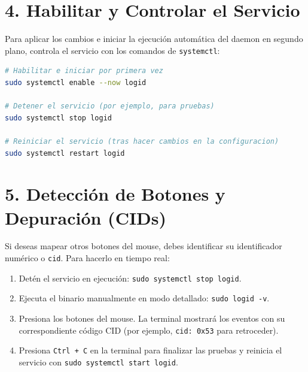 \documentclass[11pt,a4paper]{article}
\begin{document}
\section{4. Habilitar y Controlar el Servicio}
Para aplicar los cambios e iniciar la ejecución automática del daemon en segundo plano, controla el servicio con los comandos de \texttt{systemctl}:

\begin{lstlisting}[language=bash]
# Habilitar e iniciar por primera vez
sudo systemctl enable --now logid

# Detener el servicio (por ejemplo, para pruebas)
sudo systemctl stop logid

# Reiniciar el servicio (tras hacer cambios en la configuracion)
sudo systemctl restart logid
\end{lstlisting}

\section{5. Detección de Botones y Depuración (CIDs)}
Si deseas mapear otros botones del mouse, debes identificar su identificador numérico o \texttt{cid}. Para hacerlo en tiempo real:

\begin{enumerate}
    \item Detén el servicio en ejecución: \texttt{sudo systemctl stop logid}.
    \item Ejecuta el binario manualmente en modo detallado: \texttt{sudo logid -v}.
    \item Presiona los botones del mouse. La terminal mostrará los eventos con su correspondiente código CID (por ejemplo, \texttt{cid: 0x53} para retroceder).
    \item Presiona \texttt{Ctrl + C} en la terminal para finalizar las pruebas y reinicia el servicio con \texttt{sudo systemctl start logid}.
\end{enumerate}
\end{document}
